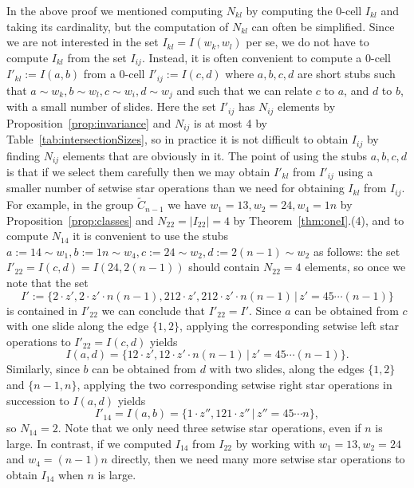 \documentclass[ALCO,Unicode,published]{cedram}
\newcommand{\abs}[1]{\lvert #1 \rvert}
\begin{document}
\begin{remark}
    In the above proof we mentioned computing $N_{kl}$ by computing the 0-cell $I_{kl}$ and taking
    its cardinality, but the computation of $N_{kl}$ can often be simplified. Since we are not
    interested in the set $I_{kl}=I(w_k,w_l)$ per se, we do not have to compute $I_{kl}$ from the
    set $I_{ij}$. Instead,  it is often convenient to compute a 0-cell $I'_{kl}:=I(a,b)$ from a
    0-cell $I'_{ij}:=I(c,d)$ where $a,b,c,d$ are short stubs such that $a\sim w_k, b\sim w_l, c\sim
    w_i, d\sim w_j$ and such that we can relate $c$ to $a$, and $d$ to $b$, with a small number of
    slides.  Here the set $I'_{ij}$ has $N_{ij}$ elements by Proposition~\ref{prop:invariance} and $N_{ij}$ is
    at most 4 by Table~\ref{tab:intersectionSizes}, so in practice it is not difficult to obtain $I_{ij}$
    by finding $N_{ij}$ elements that are obviously in it.  The point of using the stubs $a,b,c,d$
    is that if we select them carefully then we may obtain $I'_{kl}$ from $I'_{ij}$ using a smaller
    number of setwise star operations than we need for obtaining $I_{kl}$ from $I_{ij}$. For
    example, in the group $\tilde C_{n-1}$ we have $w_1=13, w_2=24, w_4=1n$ by Proposition~\ref{prop:classes}
    and $N_{22}=\abs{I_{22}}=4$ by Theorem~\ref{thm:oneI}.(4), and to compute $N_{14}$ it is convenient to
    use the stubs $a:=14\sim w_1, b:=1n\sim w_4, c:=24\sim w_2, d:=2(n-1)\sim w_2$ as follows: the
    set $I'_{22}=I(c,d)=I(24,2(n-1))$ should contain $N_{22}=4$ elements, so once we note that the
    set \[ I':=\{2\cdot z', 2\cdot z'\cdot n(n-1), 212\cdot z', 212\cdot z'\cdot n(n-1) \,\vert\,
    z'=45\cdots (n-1)\} \] is contained in $I'_{22}$ we can conclude that $I'_{22}=I'$. Since $a$
    can be obtained from $c$ with one slide along the edge $\{1,2\}$, applying the corresponding
    setwise left star operations to $I'_{22}=I(c,d)$ yields \[ I(a,d)=\{12\cdot z', 12\cdot z'\cdot
    n(n-1) \,\vert\, z'=45\cdots (n-1)\}.  \] Similarly, since $b$ can be obtained from $d$ with two
    slides, along the edges $\{1,2\}$ and $\{n-1,n\}$, applying the two corresponding setwise right
    star operations in succession to $I(a,d)$ yields \[ I'_{14}=I(a,b)=\{1\cdot z'', 121\cdot
    z''\,\vert\, z''=45\cdots n\}, \] so $N_{14}=2$. Note that we only need three setwise star
    operations, even if $n$ is large.  In contrast, if we computed $I_{14}$ from $I_{22}$ by
    working with $w_1=13,w_2=24$ and $w_4=(n-1)n$ directly, then we need many more setwise star
    operations to obtain $I_{14}$ when $n$ is large.
    \label{rmk:shortcut}
\end{remark}   
\end{document}
